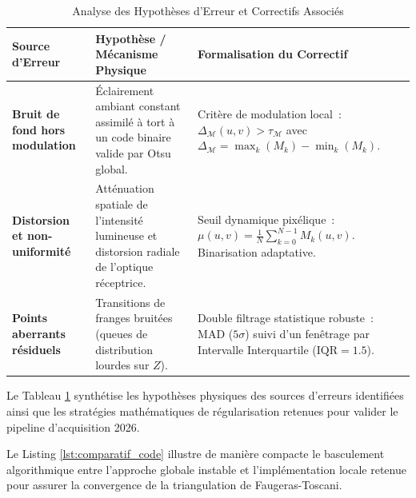\documentclass[10pt]{article} %
\begin{document}
\begin{table}[H]
\caption{Analyse des Hypothèses d'Erreur et Correctifs Associés}
\label{tab:hypotheses_erreurs}
\centering
\begin{tabular}{p{4cm}p{5cm}p{5cm}}
\toprule
\textbf{Source d'Erreur} & \textbf{Hypothèse / Mécanisme Physique} & \textbf{Formalisation du Correctif} \\
\midrule
\textbf{Bruit de fond hors modulation} & Éclairement ambiant constant assimilé à tort à un code binaire valide par Otsu global. & Critère de modulation local~: $\Delta_{\mathcal{M}}(u,v) > \tau_{\mathcal{M}}$ avec $\Delta_{\mathcal{M}} = \max_k(M_k) - \min_k(M_k)$. \\
\midrule
\textbf{Distorsion et non-uniformité} & Atténuation spatiale de l'intensité lumineuse et distorsion radiale de l'optique réceptrice. & Seuil dynamique pixélique~: $\mu(u,v) = \frac{1}{N}\sum_{k=0}^{N-1} M_k(u,v)$. Binarisation adaptative. \\
\midrule
\textbf{Points aberrants résiduels} & Transitions de franges bruitées (queues de distribution lourdes sur $Z$). & Double filtrage statistique robuste~: $\text{MAD}$ ($5\sigma$) suivi d'un fenêtrage par Intervalle Interquartile ($\text{IQR} = 1.5$). \\
\bottomrule
\end{tabular}
\end{table}



Le Tableau \ref{tab:hypotheses_erreurs} synthétise les hypothèses physiques des sources d'erreurs identifiées ainsi que les stratégies mathématiques de régularisation retenues pour valider le pipeline d'acquisition 2026.



Le Listing \ref{lst:comparatif_code} illustre de manière compacte le basculement algorithmique entre l'approche globale instable et l'implémentation locale retenue pour assurer la convergence de la triangulation de Faugeras-Toscani.
\end{document}

